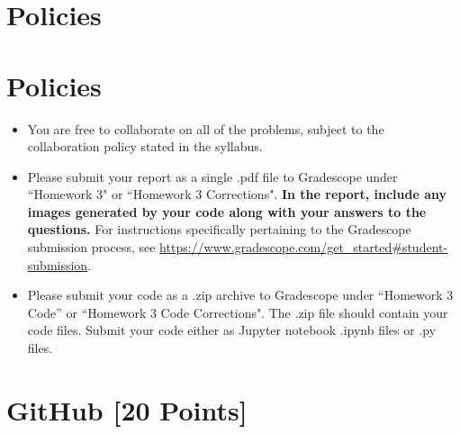 \newif\ifshowsolutions
\showsolutionsfalse




\pagestyle{fancy}

\section*{Policies}

\section*{Policies}
\begin{itemize}
	\item You are free to collaborate on all of the problems, subject to the collaboration policy stated in the syllabus.
	\item Please submit your report as a single .pdf file to Gradescope under ``Homework 3" or ``Homework 3 Corrections".
	      \textbf{In the report, include any images generated by your code along with your answers to the questions.}
	      For instructions specifically pertaining to the Gradescope submission process, see \url{https://www.gradescope.com/get_started#student-submission}.
	\item Please submit your code as a .zip archive to Gradescope under ``Homework 3 Code'' or ``Homework 3 Code Corrections".
	      The .zip file should contain your code files.
	      Submit your code either as Jupyter notebook .ipynb files or .py files.
\end{itemize}

\newpage
\section{GitHub [20 Points]}


